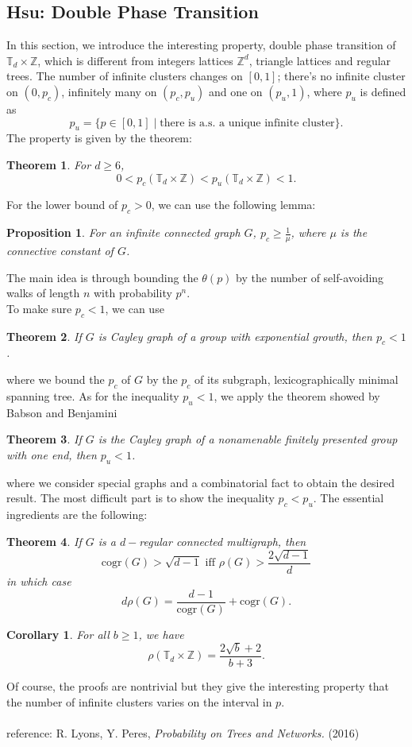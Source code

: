 \documentclass[12pt]{article}
\theoremstyle{plane}
\newtheorem*{thm}{Theorem}
\newtheorem*{cor}{Corollary}
\newtheorem*{prop}{Proposition}
\theoremstyle{definition}
\begin{document}
\subsection*{Hsu: Double Phase Transition}
In this section, we introduce the interesting property, double phase transition of $\mathbb{T}_d\times\mathbb{Z}$, which is different from integers lattices $\mathbb{Z}^d$, triangle lattices and regular trees. The number of infinite clusters changes on $[0,1]$; there's no infinite cluster on $(0,p_c)$, infinitely many on $(p_c,p_u)$ and one on $(p_u,1)$, where $p_u$ is defined as \[p_u=\{p\in [0,1] \mid \text{there is a.s. a unique infinite cluster}\}.\]
The property is given by the theorem:
\begin{thm}
For $d\geq 6$, \[0<p_c(\mathbb{T}_d\times\mathbb{Z})<p_u(\mathbb{T}_d\times\mathbb{Z})<1.\]
\end{thm}
For the lower bound of $p_c>0$, we can use the following lemma:
\begin{prop}
For an infinite connected graph $G$, $p_c\geq\frac{1}{\mu}$, where $\mu$ is the connective constant of $G$.
\end{prop}
The main idea is through bounding the $\theta(p)$ by the number of self-avoiding walks of length $n$ with probability $p^n$.\\To make sure $p_c<1$, 
we can use 
\begin{thm}
If $G$ is Cayley graph of a group with exponential growth, then $p_c<1$.
\end{thm}
where we bound the $p_c$ of $G$ by the $p_c$ of its subgraph, lexicographically minimal spanning tree. As for the inequality $p_u<1$, we apply the theorem showed by Babson and Benjamini
\begin{thm}
If $G$ is the Cayley graph of a nonamenable finitely presented group with one end, then $p_u<1$.
\end{thm}
where we consider special graphs and a combinatorial fact to obtain the desired result. The most difficult part is to show the inequality $p_c<p_u$. The essential ingredients are the following:
\begin{thm}
If $G$ is a $d-$regular connected multigraph, then \[\text{cogr}(G)>\sqrt{d-1} \text{ iff } \rho(G)>\frac{2\sqrt{d-1}}{d}\] in which case \[d\rho(G)=\frac{d-1}{\text{cogr}(G)}+\text{cogr}(G).\]
\end{thm}
\begin{cor}
For all $b\geq 1$, we have \[\rho(\mathbb{T}_d\times\mathbb{Z})=\frac{2\sqrt{b}+2}{b+3}.\]
\end{cor}
Of course, the proofs are nontrivial but they give the interesting property that the number of infinite clusters varies on the interval in $p$. \\
\bigskip\\
reference: R. Lyons, Y. Peres, \textit{Probability on Trees and Networks.} (2016)
\end{document}
